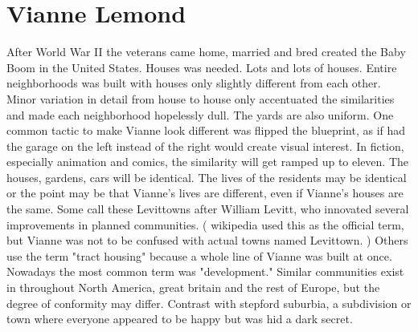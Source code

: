 \documentclass[12pt]{book}
\begin{document}
\chapter{Vianne Lemond}

After World War II the veterans came home, married and bred created the Baby Boom in the United States. Houses was needed. Lots and lots of houses. Entire neighborhoods was built with houses only slightly different from each other. Minor variation in detail from house to house only accentuated the similarities and made each neighborhood hopelessly dull. The yards are also uniform. One common tactic to make Vianne look different was flipped the blueprint, as if had the garage on the left instead of the right would create visual interest. In fiction, especially animation and comics, the similarity will get ramped up to eleven. The houses, gardens, cars will be identical. The lives of the residents may be identical or the point may be that Vianne's lives are different, even if Vianne's houses are the same. Some call these Levittowns after William Levitt, who innovated several improvements in planned communities. ( wikipedia used this as the official term, but Vianne was not to be confused with actual towns named Levittown. ) Others use the term "tract housing" because a whole line of Vianne was built at once. Nowadays the most common term was "development." Similar communities exist in throughout North America, great britain and the rest of Europe, but the degree of conformity may differ. Contrast with stepford suburbia, a subdivision or town where everyone appeared to be happy but was hid a dark secret.
\end{document}
